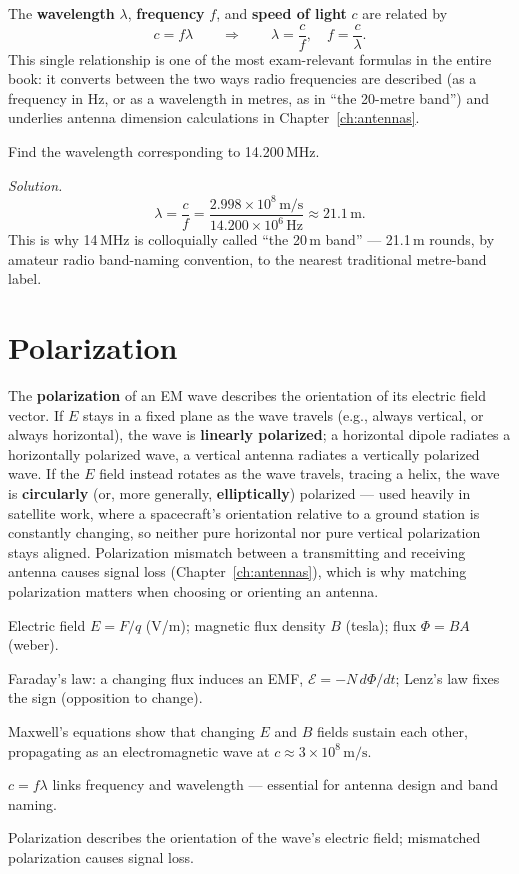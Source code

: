 The \textbf{wavelength} $\lambda$, \textbf{frequency} $f$, and
\textbf{speed of light} $c$ are related by
\[
\boxed{c = f\lambda} \qquad \Longrightarrow \qquad \lambda = \frac{c}{f}, \quad f = \frac{c}{\lambda}.
\]
This single relationship is one of the most exam-relevant formulas in the
entire book: it converts between the two ways radio frequencies are
described (as a frequency in Hz, or as a wavelength in metres, as in
``the 20-metre band'') and underlies antenna dimension calculations in
Chapter~\ref{ch:antennas}.

\begin{examplebox}
Find the wavelength corresponding to 14.200\,MHz.

\emph{Solution.}
\[
\lambda = \frac{c}{f} = \frac{2.998\times10^{8}\,\text{m/s}}{14.200\times10^{6}\,\text{Hz}} \approx 21.1\,\text{m}.
\]
This is why 14\,MHz is colloquially called ``the 20\,m band'' --- 21.1\,m
rounds, by amateur radio band-naming convention, to the nearest
traditional metre-band label.
\end{examplebox}

\section{Polarization}

The \textbf{polarization} of an EM wave describes the orientation of its
electric field vector. If $E$ stays in a fixed plane as the wave travels
(e.g., always vertical, or always horizontal), the wave is
\textbf{linearly polarized}; a horizontal dipole radiates a horizontally
polarized wave, a vertical antenna radiates a vertically polarized wave.
If the $E$ field instead rotates as the wave travels, tracing a helix, the
wave is \textbf{circularly} (or, more generally, \textbf{elliptically})
polarized --- used heavily in satellite work, where a spacecraft's
orientation relative to a ground station is constantly changing, so
neither pure horizontal nor pure vertical polarization stays aligned.
Polarization mismatch between a transmitting and receiving antenna causes
signal loss (Chapter~\ref{ch:antennas}), which is why matching
polarization matters when choosing or orienting an antenna.

\begin{quickreview}
\item Electric field $E = F/q$ (V/m); magnetic flux density $B$ (tesla);
flux $\Phi = BA$ (weber).
\item Faraday's law: a changing flux induces an EMF, $\mathcal{E} =
-N\,d\Phi/dt$; Lenz's law fixes the sign (opposition to change).
\item Maxwell's equations show that changing $E$ and $B$ fields sustain
each other, propagating as an electromagnetic wave at $c \approx
3\times10^{8}\,\text{m/s}$.
\item $c = f\lambda$ links frequency and wavelength --- essential for
antenna design and band naming.
\item Polarization describes the orientation of the wave's electric
field; mismatched polarization causes signal loss.
\end{quickreview}

